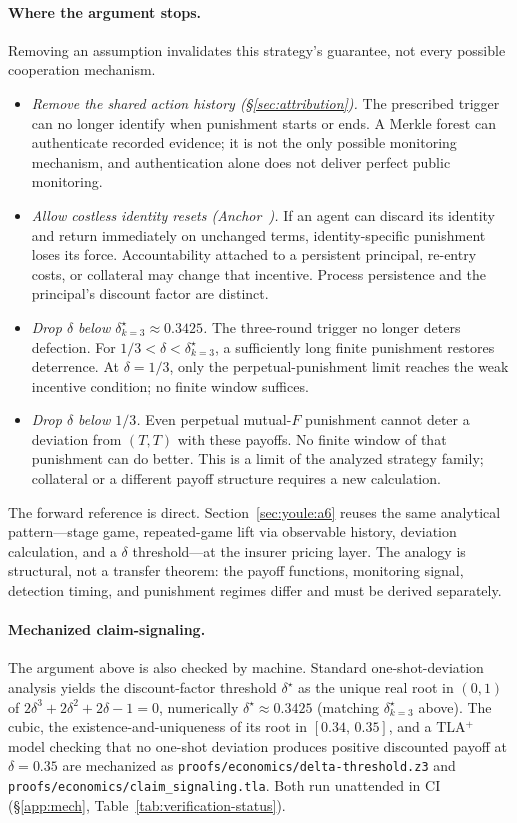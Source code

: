 \documentclass[11pt,a4paper]{article}
\theoremstyle{definition}
\theoremstyle{remark}
\begin{document}
\paragraph{Where the argument stops.}
Removing an assumption invalidates this strategy's guarantee, not every possible cooperation mechanism.
\begin{itemize}[nosep]
  \item \emph{Remove the shared action history (\S\ref{sec:attribution}).} The prescribed trigger can no longer identify when punishment starts or ends. A Merkle forest can authenticate recorded evidence; it is not the only possible monitoring mechanism, and authentication alone does not deliver perfect public monitoring.
  \item \emph{Allow costless identity resets (Anchor~).} If an agent can discard its identity and return immediately on unchanged terms, identity-specific punishment loses its force. Accountability attached to a persistent principal, re-entry costs, or collateral may change that incentive. Process persistence and the principal's discount factor are distinct.
  \item \emph{Drop $\delta$ below $\delta^\star_{k=3} \approx 0.3425$.} The three-round trigger no longer deters defection. For $1/3<\delta<\delta^\star_{k=3}$, a sufficiently long finite punishment restores deterrence. At $\delta=1/3$, only the perpetual-punishment limit reaches the weak incentive condition; no finite window suffices.
  \item \emph{Drop $\delta$ below $1/3$.} Even perpetual mutual-$F$ punishment cannot deter a deviation from $(T,T)$ with these payoffs. No finite window of that punishment can do better. This is a limit of the analyzed strategy family; collateral or a different payoff structure requires a new calculation.
\end{itemize}

The forward reference is direct. Section~\ref{sec:youle:a6} reuses the same analytical pattern---stage game, repeated-game lift via observable history, deviation calculation, and a $\delta$ threshold---at the insurer pricing layer. The analogy is structural, not a transfer theorem: the payoff functions, monitoring signal, detection timing, and punishment regimes differ and must be derived separately.

\paragraph{Mechanized claim-signaling.} The argument above is also checked by machine. Standard one-shot-deviation analysis yields the discount-factor threshold $\delta^\star$ as the unique real root in $(0,1)$ of $2\delta^3 + 2\delta^2 + 2\delta - 1 = 0$, numerically $\delta^\star \approx 0.3425$ (matching $\delta^\star_{k=3}$ above). The cubic, the existence-and-uniqueness of its root in $[0.34,\,0.35]$, and a TLA$^{+}$ model checking that no one-shot deviation produces positive discounted payoff at $\delta = 0.35$ are mechanized as \texttt{proofs/economics/delta-threshold.z3} and \texttt{proofs/economics/claim\_signaling.tla}. Both run unattended in CI (\S\ref{app:mech}, Table~\ref{tab:verification-status}).
\end{document}
